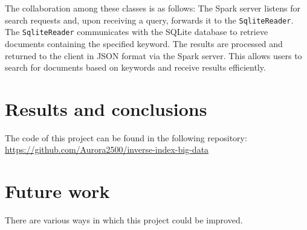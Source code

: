\documentclass{article}
\begin{document}
The collaboration among these classes is as follows: The Spark server listens for search requests and, upon receiving a query, forwards it to the \texttt{SqliteReader}. The \texttt{SqliteReader} communicates with the SQLite database to retrieve documents containing the specified keyword. The results are processed and returned to the client in JSON format via the Spark server. This allows users to search for documents based on keywords and receive results efficiently.



\section{Results and conclusions}


The code of this project can be found in the following repository: \url{https://github.com/Aurora2500/inverse-index-big-data}

\section{Future work}

There are various ways in which this project could be improved.
\end{document}
